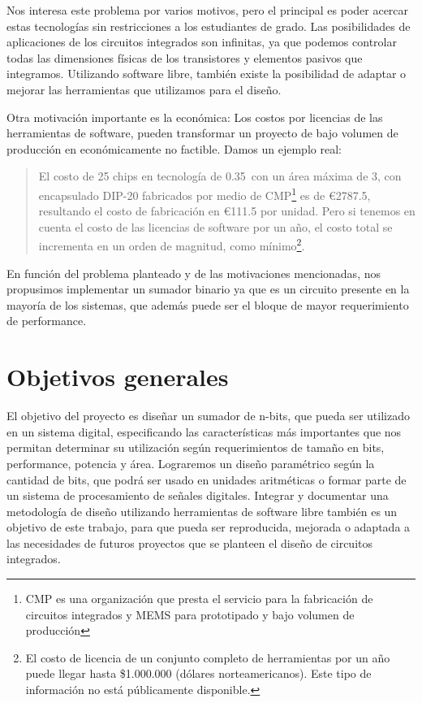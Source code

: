 Nos interesa este problema por varios motivos, pero el principal es poder acercar estas tecnologías sin restricciones a los estudiantes de grado. Las posibilidades de aplicaciones de los circuitos integrados son infinitas, ya que podemos controlar todas las dimensiones físicas de los transistores y elementos pasivos que integramos. Utilizando software libre, también existe la posibilidad de adaptar o mejorar las herramientas que utilizamos para el diseño.

Otra motivación importante es la económica: Los costos por licencias de las herramientas de software, pueden transformar un proyecto de bajo volumen de producción en económicamente no factible. Damos un ejemplo real: 

\begin{quote}
El costo de 25 chips en tecnología de 0.35~\microm con un área máxima de 3\mmcuadrado, con encapsulado DIP-20 fabricados por medio de CMP\footnote{CMP es una organización que presta el servicio para la fabricación de circuitos integrados y MEMS para prototipado y bajo volumen de producción} es de \euro{2787.5}, resultando el costo de fabricación en \euro{111.5} por unidad. Pero si tenemos en cuenta el costo de las licencias de software por un año, el costo total se incrementa en un orden de magnitud, como mínimo\footnote{El costo de licencia de un conjunto completo de herramientas por un año puede llegar hasta \$1.000.000 (dólares norteamericanos). Este tipo de información no está públicamente disponible.}.
\end{quote}

En función del problema planteado y de las motivaciones mencionadas, nos propusimos implementar un sumador binario ya que es un circuito presente en la mayoría de los sistemas, que además puede ser el bloque de mayor requerimiento de performance.
\section{Objetivos generales}

El objetivo del proyecto es diseñar un sumador de n-bits, que pueda ser utilizado en un sistema digital, especificando las características más importantes que nos permitan determinar su utilización según requerimientos de tamaño en bits, performance, potencia y área. Lograremos un diseño paramétrico según la cantidad de bits, que podrá ser usado en unidades aritméticas o formar parte de un sistema de procesamiento de señales digitales. Integrar y documentar una metodología de diseño utilizando herramientas de software libre también es un objetivo de este trabajo, para que pueda ser reproducida, mejorada o adaptada a las necesidades de futuros proyectos que se planteen el diseño de circuitos integrados.


